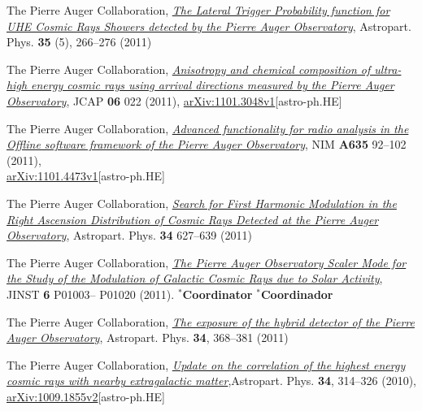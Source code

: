 \begin{etaremune}
\item {}The Pierre Auger Collaboration, 
\href{http://dx.doi.org/10.1016/j.astropartphys.2011.08.001}{\emph{The Lateral
Trigger Probability function for UHE Cosmic Rays Showers detected by the Pierre
Auger Observatory}}, Astropart. Phys. {\bf{35}} (5), 266--276 (2011)

\item {}The Pierre Auger Collaboration,
\href{http://dx.doi.org/10.1088/1475-7516/2011/06/022}{\emph{Anisotropy and
chemical composition of ultra-high energy cosmic rays using arrival directions
measured by the Pierre Auger Observatory}}, JCAP {\bf 06} 022 (2011),
\href{http://arxiv.org/abs/1106.3048}{arXiv:1101.3048v1}[astro-ph.HE]

\item {}The Pierre Auger Collaboration,
\href{http://dx.doi.org/10.1016/j.nima.2011.01.049}{{\emph{Advanced
functionality for radio analysis in the Offline software framework of the
Pierre Auger Observatory}}}, NIM {\bf A635} 92--102
(2011),\\
\href{http://arxiv.org/abs/1101.4473}{arXiv:1101.4473v1}[astro-ph.HE]

\item {}The Pierre Auger Collaboration,
\href{http://dx.doi.org/10.1016/j.astropartphys.2010.12.007}{\emph{Search for
First Harmonic Modulation in the Right Ascension Distribution of Cosmic Rays
Detected at the Pierre Auger Observatory}}, Astropart. Phys. {\bf 34} 627--639
(2011)

\item {}The Pierre Auger Collaboration,
\href{http://dx.doi.org/10.1088/1748-0221/6/01/P01003}{\emph{The Pierre Auger
Observatory Scaler Mode for the Study of the Modulation of Galactic Cosmic Rays
due to Solar Activity}}, JINST {\bf 6} P01003--
P01020 (2011). \ifeng $^*${\bf{Coordinator}} \else $^*${\bf{Coordinador}} \fi

\item {}The Pierre Auger Collaboration,
\href{http://dx.doi.org/10.1016/j.astropartphys.2010.10.001}{\emph{The exposure
of the hybrid detector of the Pierre Auger Observatory}}, Astropart. Phys. {\bf
34}, 368--381 (2011)

\item {}The Pierre Auger Collaboration,
\href{http://dx.doi.org/10.1016/j.astropartphys.2010.08.010}{\emph{Update on
the correlation of the highest energy cosmic rays with nearby extragalactic
matter}},Astropart. Phys. {\bf 34}, 314--326 (2010),
\href{http://arxiv.org/abs/1009.1855}{arXiv:1009.1855v2}[astro-ph.HE]


\end{etaremune}
